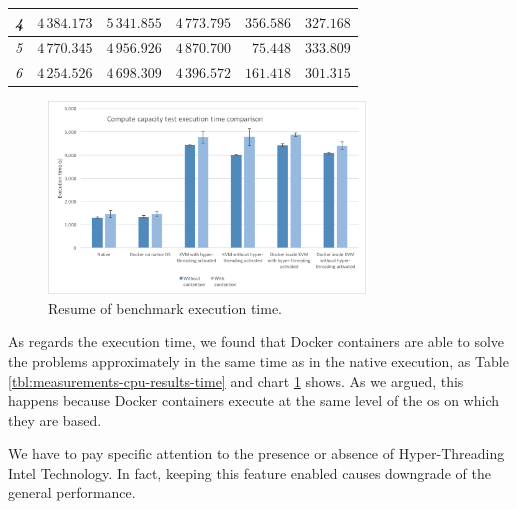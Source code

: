 \begin{center}
\begin{tabular}{| l | r | r | r | r | r |}
		\textit{4}                & $4\,384.173$ & $5\,341.855$ & $4\,773.795$ & $356.586$          & $327.168$             \\ \hline
		\textit{5}                & $4\,770.345$ & $4\,956.926$ & $4\,870.700$ & $75.448$           & $333.809$             \\ \hline
		\textit{6}                & $4\,254.526$ & $4\,698.309$ & $4\,396.572$ & $161.418$          & $301.315$             \\ \hline
	\end{tabular}
	\label{tbl:measurements-cpu-results-time}
\end{center}

\begin{figure}
	\centering{}
	\includegraphics[width=0.75\textwidth]{chapters/measurements/images/cpu-time.png}
	\caption[Compute - resume of benchmark execution time]{Resume of benchmark execution time.}
	\label{img:measurements-cpu-results-time}
\end{figure}

As regards the execution time, we found that Docker containers are able to solve the problems
approximately in the same time as in the native execution, as Table \ref{tbl:measurements-cpu-results-time}
and chart \ref{img:measurements-cpu-results-time} shows. As we argued, this happens because
Docker containers execute at the same level of the \acs{os} on which they are based.

We have to pay specific attention to the presence or absence of Hyper-Threading Intel Technology. In fact,
keeping this feature enabled causes downgrade of the general performance.